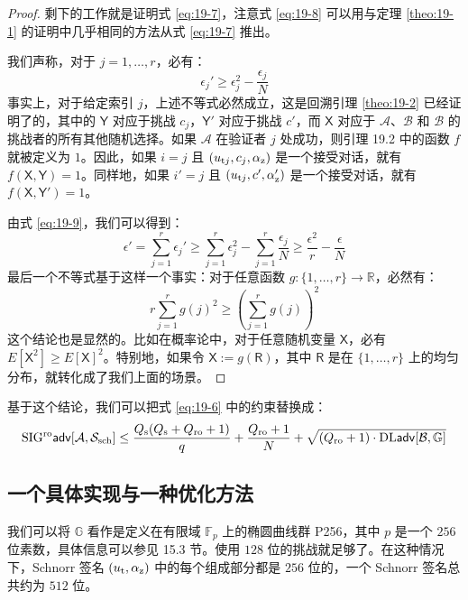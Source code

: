 \begin{proof}
剩下的工作就是证明式 \ref{eq:19-7}，注意式 \ref{eq:19-8} 可以用与定理 \ref{theo:19-1} 的证明中几乎相同的方法从式 \ref{eq:19-7} 推出。

我们声称，对于 $j=1,\dots,r$，必有：
\begin{equation}\label{eq:19-9}
\epsilon_j'\geq\epsilon_j^2-\frac{\epsilon_j}{N}
\end{equation}
事实上，对于给定索引 $j$，上述不等式必然成立，这是回溯引理 \ref{theo:19-2} 已经证明了的，其中的 $\mathsf{Y}$ 对应于挑战 $c_j$，$\mathsf{Y}'$ 对应于挑战 $c'$，而 $\mathsf{X}$ 对应于 $\mathcal{A}$、$\mathcal{B}$ 和 $\mathcal{B}$ 的挑战者的所有其他随机选择。如果 $\mathcal{A}$ 在验证者 $j$ 处成功，则引理 19.2 中的函数 $f$ 就被定义为 $1$。因此，如果 $i=j$ 且 $(u_{{\rm t}j},c_j,\alpha_{\rm z})$ 是一个接受对话，就有 $f(\mathsf{X},\mathsf{Y})=1$。同样地，如果 $i'=j$ 且 $(u_{{\rm t}j},c',\alpha_{\rm z}')$ 是一个接受对话，就有 $f(\mathsf{X},\mathsf{Y}')=1$。

由式 \ref{eq:19-9}，我们可以得到：
\[
\epsilon'
=\sum_{j=1}^r\epsilon_j'
\geq\sum_{j=1}^r\epsilon_j^2-\sum_{j=1}^r\frac{\epsilon_j}{N}
\geq\frac{\epsilon^2}{r}-\frac{\epsilon}{N}
\]
最后一个不等式基于这样一个事实：对于任意函数 $g:\{1,\dots,r\}\to\mathbb{R}$，必然有：
\[
r\sum_{j=1}^rg(j)^2\geq(\sum_{j=1}^rg(j))^2
\]
这个结论也是显然的。比如在概率论中，对于任意随机变量 $\mathsf{X}$，必有 $E[\mathsf{X}^2]\geq E[\mathsf{X}]^2$。特别地，如果令 $\mathsf{X}:=g(\mathsf{R})$，其中 $\mathsf{R}$ 是在 $\{1,\dots,r\}$ 上的均匀分布，就转化成了我们上面的场景。
\end{proof}

基于这个结论，我们可以把式 \ref{eq:19-6} 中的约束替换成：
\begin{equation}
{\rm SIG^{ro}\mathsf{adv}}[\mathcal{A},\mathcal{S}_{\rm sch}]\leq\frac{Q_{\rm s}(Q_{\rm s}+Q_{\rm ro}+1)}{q}+\frac{Q_{\rm ro}+1}{N}+\sqrt{(Q_{\rm ro}+1)\cdot{\rm DL\mathsf{adv}}[\mathcal{B},\mathbb{G}]}
\end{equation}


\subsection{一个具体实现与一种优化方法}\label{subsec:19-2-3}

我们可以将 $\mathbb{G}$ 看作是定义在有限域 $\mathbb{F}_p$ 上的椭圆曲线群 P256，其中 $p$ 是一个 $256$ 位素数，具体信息可以参见 15.3 节。使用 $128$ 位的挑战就足够了。在这种情况下，Schnorr 签名 $(u_{\rm t},\alpha_{\rm z})$ 中的每个组成部分都是 $256$ 位的，一个 Schnorr 签名总共约为 $512$ 位。

